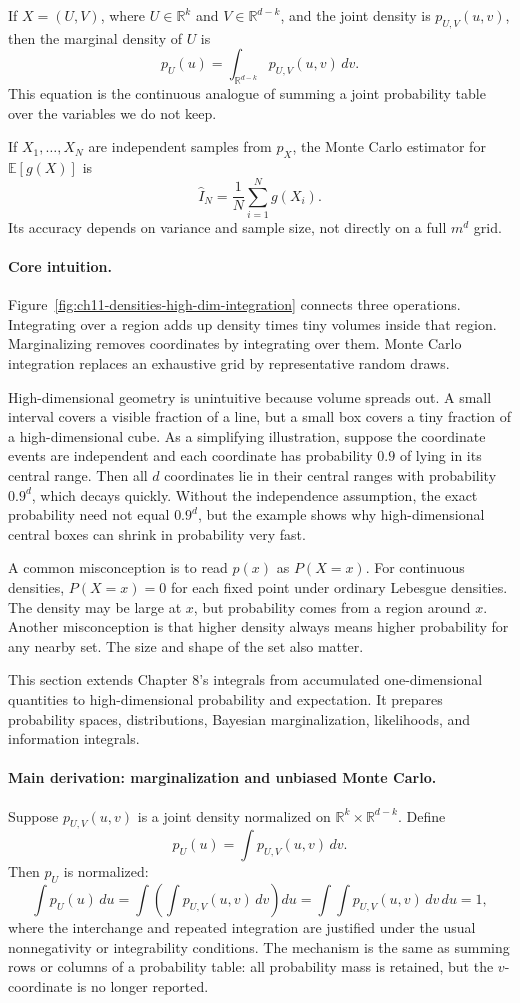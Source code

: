 If \(X=(U,V)\), where \(U\in\mathbb{R}^k\) and \(V\in\mathbb{R}^{d-k}\), and the joint density is \(p_{U,V}(u,v)\), then the marginal density of \(U\) is
\[
p_U(u)=\int_{\mathbb{R}^{d-k}}p_{U,V}(u,v)\,dv.
\]
This equation is the continuous analogue of summing a joint probability table over the variables we do not keep.

If \(X_1,\ldots,X_N\) are independent samples from \(p_X\), the Monte Carlo estimator for \(\mathbb{E}[g(X)]\) is
\[
\widehat{I}_N=\frac{1}{N}\sum_{i=1}^N g(X_i).
\]
Its accuracy depends on variance and sample size, not directly on a full \(m^d\) grid.

\paragraph{Core intuition.}
Figure~\ref{fig:ch11-densities-high-dim-integration} connects three operations. Integrating over a region adds up density times tiny volumes inside that region. Marginalizing removes coordinates by integrating over them. Monte Carlo integration replaces an exhaustive grid by representative random draws.

High-dimensional geometry is unintuitive because volume spreads out. A small interval covers a visible fraction of a line, but a small box covers a tiny fraction of a high-dimensional cube. As a simplifying illustration, suppose the coordinate events are independent and each coordinate has probability \(0.9\) of lying in its central range. Then all \(d\) coordinates lie in their central ranges with probability \(0.9^d\), which decays quickly. Without the independence assumption, the exact probability need not equal \(0.9^d\), but the example shows why high-dimensional central boxes can shrink in probability very fast.

A common misconception is to read \(p(x)\) as \(P(X=x)\). For continuous densities, \(P(X=x)=0\) for each fixed point under ordinary Lebesgue densities. The density may be large at \(x\), but probability comes from a region around \(x\). Another misconception is that higher density always means higher probability for any nearby set. The size and shape of the set also matter.

This section extends Chapter 8's integrals from accumulated one-dimensional quantities to high-dimensional probability and expectation. It prepares probability spaces, distributions, Bayesian marginalization, likelihoods, and information integrals.

\paragraph{Main derivation: marginalization and unbiased Monte Carlo.}
Suppose \(p_{U,V}(u,v)\) is a joint density normalized on \(\mathbb{R}^k\times\mathbb{R}^{d-k}\). Define
\[
p_U(u)=\int p_{U,V}(u,v)\,dv.
\]
Then \(p_U\) is normalized:
\[
\int p_U(u)\,du
=
\int\left(\int p_{U,V}(u,v)\,dv\right)du
=
\int\int p_{U,V}(u,v)\,dv\,du
=1,
\]
where the interchange and repeated integration are justified under the usual nonnegativity or integrability conditions. The mechanism is the same as summing rows or columns of a probability table: all probability mass is retained, but the \(v\)-coordinate is no longer reported.

